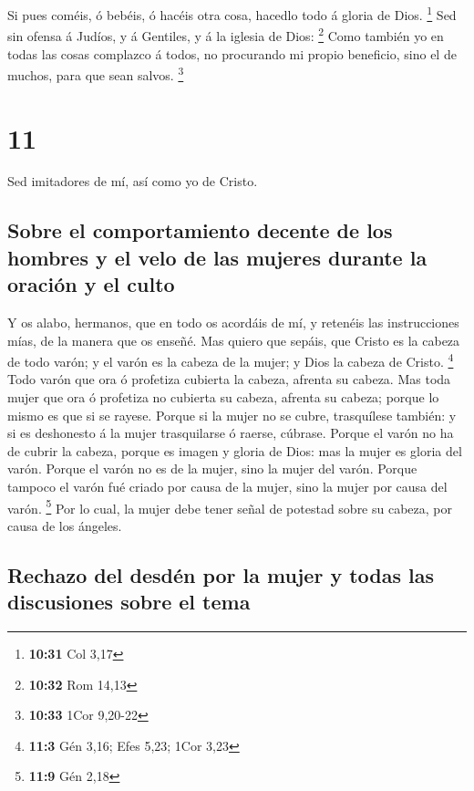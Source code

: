  Si pues coméis, ó bebéis, ó hacéis otra cosa, hacedlo
todo á gloria de Dios. \footnote{\textbf{10:31} Col 3,17}
 Sed sin ofensa á Judíos, y á Gentiles, y á la iglesia de
Dios: \footnote{\textbf{10:32} Rom 14,13}  Como también
yo en todas las cosas complazco á todos, no procurando mi propio
beneficio, sino el de muchos, para que sean salvos. \footnote{\textbf{10:33}
  1Cor 9,20-22}

\hypertarget{section-10}{%
\section{11}\label{section-10}}

 Sed imitadores de mí, así como yo de Cristo.

\hypertarget{sobre-el-comportamiento-decente-de-los-hombres-y-el-velo-de-las-mujeres-durante-la-oraciuxf3n-y-el-culto}{%
\subsection{Sobre el comportamiento decente de los hombres y el velo de
las mujeres durante la oración y el
culto}\label{sobre-el-comportamiento-decente-de-los-hombres-y-el-velo-de-las-mujeres-durante-la-oraciuxf3n-y-el-culto}}

 Y os alabo, hermanos, que en todo os acordáis de mí, y
retenéis las instrucciones mías, de la manera que os enseñé.
 Mas quiero que sepáis, que Cristo es la cabeza de todo
varón; y el varón es la cabeza de la mujer; y Dios la cabeza de Cristo.
\footnote{\textbf{11:3} Gén 3,16; Efes 5,23; 1Cor 3,23} 
Todo varón que ora ó profetiza cubierta la cabeza, afrenta su cabeza.
 Mas toda mujer que ora ó profetiza no cubierta su cabeza,
afrenta su cabeza; porque lo mismo es que si se rayese. 
Porque si la mujer no se cubre, trasquílese también: y si es deshonesto
á la mujer trasquilarse ó raerse, cúbrase.  Porque el
varón no ha de cubrir la cabeza, porque es imagen y gloria de Dios: mas
la mujer es gloria del varón.  Porque el varón no es de la
mujer, sino la mujer del varón.  Porque tampoco el varón
fué criado por causa de la mujer, sino la mujer por causa del varón.
\footnote{\textbf{11:9} Gén 2,18}  Por lo cual, la mujer
debe tener señal de potestad sobre su cabeza, por causa de los ángeles.

\hypertarget{rechazo-del-desduxe9n-por-la-mujer-y-todas-las-discusiones-sobre-el-tema}{%
\subsection{Rechazo del desdén por la mujer y todas las discusiones
sobre el
tema}\label{rechazo-del-desduxe9n-por-la-mujer-y-todas-las-discusiones-sobre-el-tema}}

